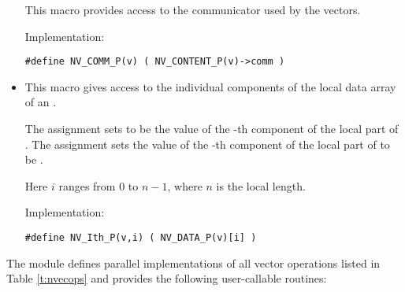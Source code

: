 \begin{itemize}
  This macro provides access to the {\mpi} communicator used by the {\nvecp}
  vectors.

  Implementation:

  \verb|#define NV_COMM_P(v) ( NV_CONTENT_P(v)->comm )|

\item {}

  This macro gives access to the individual components of the local data
  array of an .

  The assignment  sets  to be the value of 
  the -th component of the local part of . 
  The assignment    
  sets the value of the -th component of the local part of  
  to be .        
  
  Here $i$ ranges from $0$ to $n-1$, where $n$ is the local length.
      
  Implementation:

  \verb|#define NV_Ith_P(v,i) ( NV_DATA_P(v)[i] )|

\end{itemize}
The {\nvecp} module defines parallel implementations of all vector operations listed 
in Table \ref{t:nvecops} and provides the following user-callable routines:

